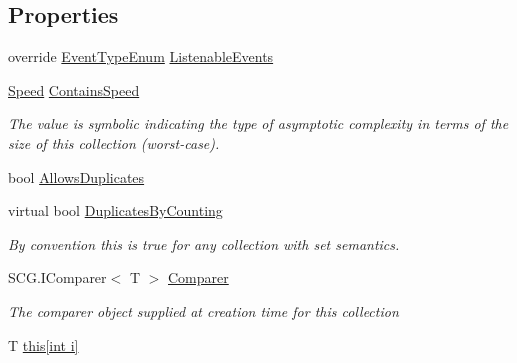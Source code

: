 \subsection*{Properties}
\begin{DoxyCompactItemize}
\item 
override \hyperlink{namespace_c5_a9143bfd561fffa025d21561674758008}{Event\+Type\+Enum} \hyperlink{class_c5_1_1_sorted_array_a82cc744cd98af8f797e1e61e3f511091}{Listenable\+Events}
\item 
\hyperlink{namespace_c5_a615ba88dcdaa8d5a3c5f833a73d7fad6}{Speed} \hyperlink{class_c5_1_1_sorted_array_abbd4d1c48fdb83cd02a18d6929401d55}{Contains\+Speed}
\begin{DoxyCompactList}\small\item\em The value is symbolic indicating the type of asymptotic complexity in terms of the size of this collection (worst-\/case). \end{DoxyCompactList}\item 
bool \hyperlink{class_c5_1_1_sorted_array_ac70b6a2e586623387d81b09741224af3}{Allows\+Duplicates}
\item 
virtual bool \hyperlink{class_c5_1_1_sorted_array_a14c1830c13567153254f60c3719af675}{Duplicates\+By\+Counting}
\begin{DoxyCompactList}\small\item\em By convention this is true for any collection with set semantics. \end{DoxyCompactList}\item 
S\+C\+G.\+I\+Comparer$<$ T $>$ \hyperlink{class_c5_1_1_sorted_array_a9ed85152fad0bbcbbc1213d1456a10b8}{Comparer}
\begin{DoxyCompactList}\small\item\em The comparer object supplied at creation time for this collection \end{DoxyCompactList}\item 
T \hyperlink{class_c5_1_1_sorted_array_a74311d95d2d99a2f39d62d4daa3d3fe9}{this\mbox{[}int i\mbox{]}}
\begin{DoxyCompactList}\small\item\em 

\end{DoxyCompactList}
\end{DoxyCompactItemize}

